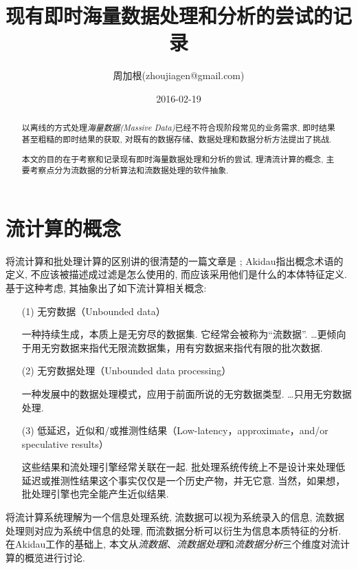 \documentclass{article}
\title{现有即时海量数据处理和分析的尝试的记录}
\author{周加根(zhoujiagen@gmail.com)}
\date{2016-02-19}
\begin{document}
\maketitle

\renewcommand\abstractname{简述}  
\begin{abstract}
\setlength{\parskip}{0.5em} %

以离线的方式处理\emph{海量数据(Massive Data)}已经不符合现阶段常见的业务需求, 即时结果甚至粗糙的即时结果的获取, 对既有的数据存储、数据处理和数据分析方法提出了挑战.

本文的目的在于考察和记录现有即时海量数据处理和分析的尝试, 理清流计算的概念, 主要考察点分为流数据的分析算法和流数据处理的软件抽象.
\end{abstract}  

\newpage

\renewcommand\contentsname{目录}  
\tableofcontents  

\newpage 

\section{流计算的概念}

将流计算和批处理计算的区别讲的很清楚的一篇文章是\cite{stream-computing101} ; Akidau指出概念术语的定义, 不应该被描述成过滤是怎么使用的, 而应该采用他们是什么的本体特征定义. 基于这种考虑, 其抽象出了如下流计算相关概念: 

\begin{enumerate}
\item[(1)] 无穷数据（Unbounded data）

一种持续生成，本质上是无穷尽的数据集. 它经常会被称为“流数据”. \dots 更倾向于用无穷数据来指代无限流数据集，用有穷数据来指代有限的批次数据.

\item[(2)] 无穷数据处理（Unbounded data processing）

一种发展中的数据处理模式，应用于前面所说的无穷数据类型. \dots 只用无穷数据处理.

\item[(3)] 低延迟，近似和/或推测性结果（Low-latency，approximate，and/or speculative results）

这些结果和流处理引擎经常关联在一起. 批处理系统传统上不是设计来处理低延迟或推测性结果这个事实仅仅是一个历史产物，并无它意. 当然，如果想，批处理引擎也完全能产生近似结果. 
\end{enumerate}

将流计算系统理解为一个信息处理系统, 流数据可以视为系统录入的信息, 流数据处理则对应为系统中信息的处理, 而流数据分析可以衍生为信息本质特征的分析. 在Akidau工作的基础上, 本文从\emph{流数据}、\emph{流数据处理}和\emph{流数据分析}三个维度对流计算的概览进行讨论.
\end{document}
